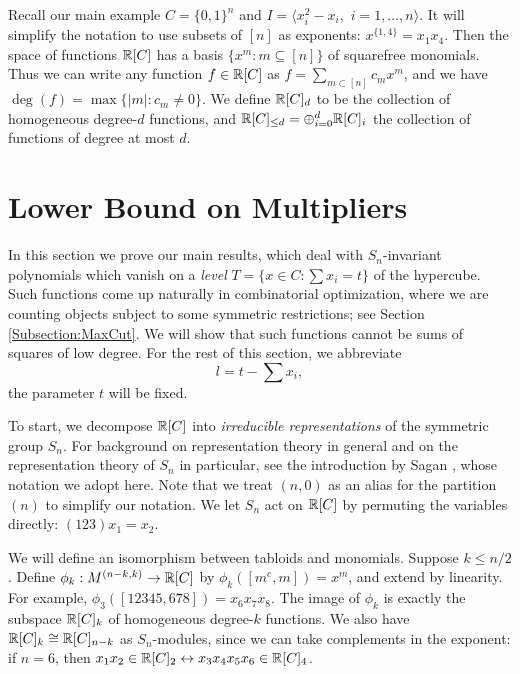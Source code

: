 Recall our main example $C = \{0,1\}^n$ and $I = \langle x_i^2 - x_i, \,\, i=1, \ldots, n \rangle$. It will simplify the notation to use subsets of $[n]$ as exponents: $x^{\{1,4\}} = x_1x_4$. Then the space of functions $\mathbb{R}[C]$ has a basis $\{x^m: m \subseteq [n]\}$ of squarefree monomials. Thus we can write any function $f \in \mathbb{R}[C]$ as 
$f = \sum_{m \subset [n]} c_mx^m$, and we have $\deg(f) = \max \{|m|: c_m \ne 0\}$. We define $\mathbb{R}[C]_d$ to be the collection of homogeneous degree-$d$ functions, and $\mathbb{R}[C]_{\le d}=\oplus_{i=0}^d \mathbb{R}[C]_i$ the collection of functions of degree at most $d$.







\section{Lower Bound on Multipliers}\label{Section:LowerBound}
In this section we prove our main results, which deal with $S_n$-invariant polynomials which vanish on a {\em level} $T = \{x \in C: \sum x_i = t\}$ of the hypercube. Such functions come up naturally in combinatorial optimization, where we are counting objects subject to some symmetric restrictions; see Section \ref{Subsection:MaxCut}. We will show that such functions cannot be sums of squares of low degree. For the rest of this section, we abbreviate $$l = t - \sum x_i,$$ the parameter $t$ will be fixed.

To start, we decompose $\mathbb{R}[C]$ into {\em irreducible representations} of the symmetric group $S_n$. For background on representation theory in general and on the representation theory of $S_n$ in particular, see the introduction by Sagan \cite{Sagan}, whose notation we adopt here. Note that we treat $(n,0)$ as an alias for the partition $(n)$ to simplify our notation. We let $S_n$ act on $\mathbb{R}[C]$ by permuting the variables directly: $(123) x_1 = x_2$.

We will define an isomorphism between tabloids and monomials. Suppose $k \le n/2$. Define $\phi_k: M^{(n-k,k)} \to \mathbb{R}[C]$ by $\phi_k([m^c,m]) = x^m$, and extend by linearity. For example, $\phi_3([12345,678]) = x_6x_7x_8$. The image of $\phi_k$ is exactly the subspace $\mathbb{R}[C]_k$ of homogeneous degree-$k$ functions. We also have $\mathbb{R}[C]_k \cong \mathbb{R}[C]_{n-k}$ as $S_n$-modules, since we can take complements in the exponent: if $n=6$, then $x_1x_2 \in \mathbb{R}[C]_2 \leftrightarrow x_3x_4x_5x_6 \in \mathbb{R}[C]_4$.

